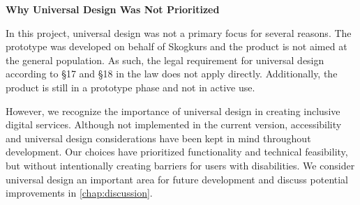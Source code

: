 \textbf{Why Universal Design Was Not Prioritized}

In this project, universal design was not a primary focus for several reasons. The prototype was developed on behalf of Skogkurs and the product is not aimed at the general population. As such, the legal requirement for universal design according to §17 and §18 in the law does not apply directly. Additionally, the product is still in a prototype phase and not in active use.

However, we recognize the importance of universal design in creating inclusive digital services. Although not implemented in the current version, accessibility and universal design considerations have been kept in mind throughout development. Our choices have prioritized functionality and technical feasibility, but without intentionally creating barriers for users with disabilities. We consider universal design an important area for future development and discuss potential improvements in \autoref{chap:discussion}.
